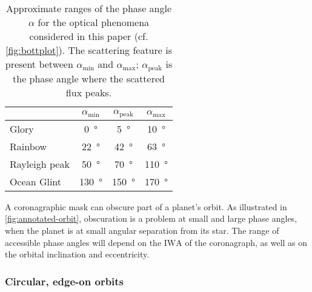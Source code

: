 \documentclass[usenatbib]{mnras}
\newcommand{\IWA}{\ensuremath{\mathrm{IWA}}\xspace}
\begin{document}
\begin{table}
    \centering
    \caption{
        Approximate ranges of the phase angle $\alpha$ for the optical phenomena considered in this paper (cf. \cref{fig:bottplot}). 
        The scattering feature is present between $\alpha_\mathrm{min}$ and $\alpha_\mathrm{max}$; $\alpha_\mathrm{peak}$ is the phase angle where the scattered flux peaks.
    }
    \label{tab:phase_ranges}
    \begin{tabular}{ l c c c } 
        \toprule
        & $\alpha_\mathrm{min}$ & $\alpha_\mathrm{peak}$ & $\alpha_\mathrm{max}$ \\
        \midrule
        Glory       & \qty{0}{\degree}     & \qty{5}{\degree}     & \qty{10}{\degree} \\
        Rainbow    & \qty{22}{\degree}    & \qty{42}{\degree}    & \qty{63}{\degree} \\
        Rayleigh peak    & \qty{50}{\degree}    & \qty{70}{\degree}    & \qty{110}{\degree} \\
        Ocean Glint & \qty{130}{\degree}   & \qty{150}{\degree}   & \qty{170}{\degree} \\
        \bottomrule
    \end{tabular}
\end{table}

A coronagraphic mask can obscure part of a planet's orbit. 
As illustrated in \cref{fig:annotated-orbit}, obscuration is a problem at small and large phase angles, when the planet is at small angular separation from its star.
The range of accessible phase angles will depend on the \IWA of the coronagraph, as well as on the orbital inclination and eccentricity.

\subsubsection{Circular, edge-on orbits}
\end{document}
